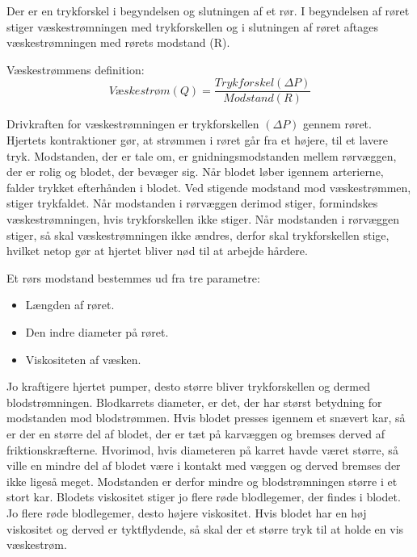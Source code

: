 Der er en trykforskel i begyndelsen og slutningen af et rør. I begyndelsen af røret stiger væskestrømningen med trykforskellen og i slutningen af røret aftages væskestrømningen med rørets modstand (R). 

Væskestrømmens definition: 
$$ Væskestrøm(Q)= \frac{Trykforskel(\Delta P)}{Modstand(R)}$$

Drivkraften for væskestrømningen er trykforskellen $(\Delta P)$ gennem røret. Hjertets kontraktioner gør, at strømmen i røret går fra et højere, til et lavere tryk. 
Modstanden, der er tale om, er gnidningsmodstanden mellem rørvæggen, der er rolig og blodet, der bevæger sig. 
Når blodet løber igennem arterierne, falder trykket efterhånden i blodet. Ved stigende modstand mod væskestrømmen, stiger trykfaldet. 
Når modstanden i rørvæggen derimod stiger, formindskes væskestrømningen, hvis trykforskellen ikke stiger.
Når modstanden i rørvæggen stiger, så skal væskestrømningen ikke ændres, derfor skal trykforskellen stige, hvilket netop gør at hjertet bliver nød til at arbejde hårdere. 

Et rørs modstand bestemmes ud fra tre parametre: 

\begin{itemize}
\item Længden af røret.
\item Den indre diameter på røret. 
\item Viskositeten af væsken.
\end{itemize}

Jo kraftigere hjertet pumper, desto større bliver trykforskellen og dermed blodstrømningen. 
Blodkarrets diameter, er det, der har størst betydning for modstanden mod blodstrømmen. Hvis blodet presses igennem et snævert kar, så er der en større del af blodet, der er tæt på karvæggen og bremses derved af friktionskræfterne. Hvorimod, hvis diameteren på karret havde været større, så ville en mindre del af blodet være i kontakt med væggen og derved bremses der ikke ligeså meget. Modstanden er derfor mindre og blodstrømningen større i et stort kar. 
Blodets viskositet stiger jo flere røde blodlegemer, der findes i blodet. Jo flere røde blodlegemer, desto højere viskositet. Hvis blodet har en høj viskositet og derved er tyktflydende, så skal der et større tryk til at holde en vis væskestrøm. 


   
